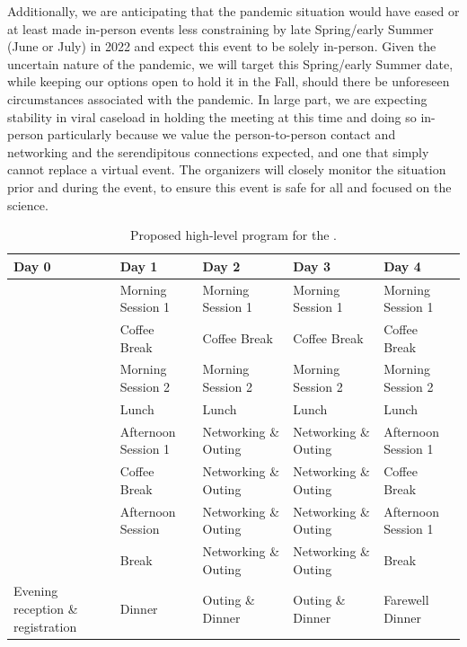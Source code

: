 Additionally, we are anticipating that the pandemic situation would
have eased or at least made in-person events less constraining by late
Spring/early Summer (June or July) in 2022 and expect this event to be
solely in-person. Given the uncertain nature of the pandemic, we will
target this Spring/early Summer date, while keeping our options open
to hold it in the Fall, should there be unforeseen circumstances
associated with the pandemic. In large part, we are expecting
stability in viral caseload in holding the meeting at this time and
doing so in-person particularly because we value the person-to-person
contact and networking and the serendipitous connections expected, and
one that simply cannot replace a virtual event. The organizers will
closely monitor the situation prior and during the event, to ensure
this event is safe for all and focused on the science.

\begin{table}[!b]
  \centering
  \begin{tabular}{|p{2.5cm}|p{2.5cm}|p{2.5cm}|p{2.5cm}|p{2.5cm}|}
    \hline 
    \rowcolor{Gray}
    \bfseries Day 0& \bfseries Day 1&\bfseries Day 2 &\bfseries Day 3 &\bfseries Day 4\\
    \hline
                   &Morning Session 1&Morning Session 1&Morning Session 1&Morning Session 1\\
    \hline
                   &Coffee Break&Coffee Break&Coffee Break&Coffee Break\\
    \hline    
                   &Morning Session 2&Morning Session 2&Morning Session 2&Morning Session 2\\
    \hline
                   &Lunch&Lunch&Lunch&Lunch\\
    \hline
                   &Afternoon Session 1&Networking \& Outing&Networking \& Outing&Afternoon Session 1\\
    \hline
                   &Coffee Break&Networking \& Outing&Networking \& Outing&Coffee Break\\
    \hline
                   &Afternoon Session &Networking \& Outing&Networking \& Outing&Afternoon Session 1\\
    \hline
                   &Break&Networking \& Outing&Networking \& Outing&Break\\
    \hline
    Evening reception \& registration&Dinner&Outing \& Dinner&Outing \&
                                                               Dinner&Farewell Dinner\\
    \hline        
  \end{tabular}
  \caption{Proposed high-level program for the \sympe.}
  \label{tab:symp}
\end{table}

